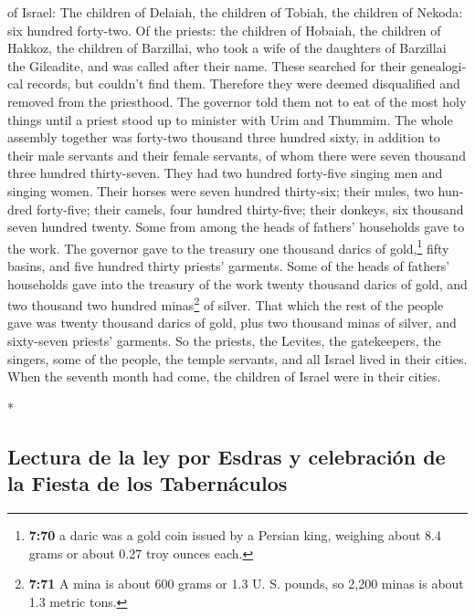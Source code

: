 \begin{paracol}{2}
\begin{otherlanguage}{english}
of Israel:  The children of Delaiah, the children of
Tobiah, the children of Nekoda: six hundred forty-two. 
Of the priests: the children of Hobaiah, the children of Hakkoz, the
children of Barzillai, who took a wife of the daughters of Barzillai the
Gileadite, and was called after their name.  These
searched for their genealogical records, but couldn't find them.
Therefore they were deemed disqualified and removed from the priesthood.
 The governor told them not to eat of the most holy
things until a priest stood up to minister with Urim and Thummim.
 The whole assembly together was forty-two thousand three
hundred sixty,  in addition to their male servants and
their female servants, of whom there were seven thousand three hundred
thirty-seven. They had two hundred forty-five singing men and singing
women.  Their horses were seven hundred thirty-six; their
mules, two hundred forty-five;  their camels, four
hundred thirty-five; their donkeys, six thousand seven hundred twenty.
 Some from among the heads of fathers' households gave to
the work. The governor gave to the treasury one thousand darics of
gold,\footnote{\textbf{7:70} a daric was a gold coin issued by a Persian
  king, weighing about 8.4 grams or about 0.27 troy ounces each.} fifty
basins, and five hundred thirty priests' garments.  Some
of the heads of fathers' households gave into the treasury of the work
twenty thousand darics of gold, and two thousand two hundred
minas\footnote{\textbf{7:71} A mina is about 600 grams or 1.3 U. S.
  pounds, so 2,200 minas is about 1.3 metric tons.} of silver.
 That which the rest of the people gave was twenty
thousand darics of gold, plus two thousand minas of silver, and
sixty-seven priests' garments.  So the priests, the
Levites, the gatekeepers, the singers, some of the people, the temple
servants, and all Israel lived in their cities. When the seventh month
had come, the children of Israel were in their cities.

\end{otherlanguage}

\switchcolumn[0]*

\hypertarget{lectura-de-la-ley-por-esdras-y-celebraciuxf3n-de-la-fiesta-de-los-tabernuxe1culos}{%
\subsection{Lectura de la ley por Esdras y celebración de la Fiesta de
los
Tabernáculos}\label{lectura-de-la-ley-por-esdras-y-celebraciuxf3n-de-la-fiesta-de-los-tabernuxe1culos}}


\end{paracol}

